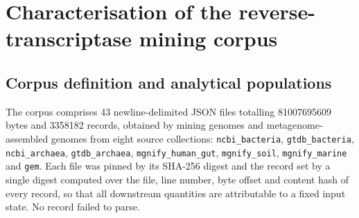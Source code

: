 %
%
%

\section{Characterisation of the reverse-transcriptase mining corpus}
\label{sec:dbchar}

\subsection{Corpus definition and analytical populations}
\label{sec:dbchar:corpus}

The corpus comprises 43 newline-delimited JSON files totalling \num{81007695609} bytes and
\num{3358182} records, obtained by mining genomes and metagenome-assembled genomes from eight
source collections: \texttt{ncbi\_bacteria}, \texttt{gtdb\_bacteria}, \texttt{ncbi\_archaea},
\texttt{gtdb\_archaea}, \texttt{mgnify\_human\_gut}, \texttt{mgnify\_soil},
\texttt{mgnify\_marine} and \texttt{gem}. Each file was pinned by its SHA-256 digest and the
record set by a single digest computed over the file, line number, byte offset and content hash of
every record, so that all downstream quantities are attributable to a fixed input state. No record
failed to parse.

